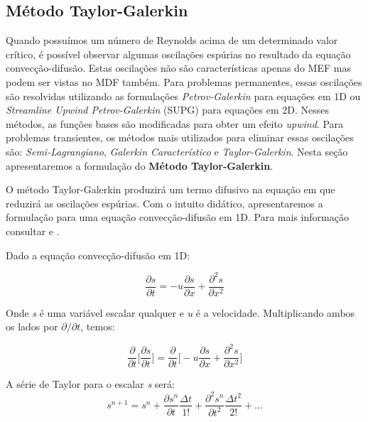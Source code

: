\subsection{Método Taylor-Galerkin}

Quando possuímos um número de Reynolds acima de um determinado
valor crítico, é possível observar algumas oscilações espúrias no resultado
da equação convecção-difusão. Estas oscilações não são características
apenas do MEF mas podem ser vistas no MDF também. Para problemas permanentes,
essas oscilações são resolvidas utilizando as formulações 
\textit{Petrov-Galerkin} para equações em 1D 
ou \textit{Streamline Upwind Petrov-Galerkin} (SUPG) para
equações em 2D. Nesses métodos, as funções bases são modificadas
para obter um efeito \textit{upwind}. Para problemas transientes,
os métodos mais utilizados para eliminar essas oscilações são:
\textit{Semi-Lagrangiano}, \textit{Galerkin Característico} e
\textit{Taylor-Galerkin}. 
Nesta seção apresentaremos a formulação do \textbf{Método Taylor-Galerkin}.


\medskip
O método Taylor-Galerkin produzirá um termo difusivo na equação em que
reduzirá as oscilações espúrias. Com o intuito didático, apresentaremos
a formulação para uma equação convecção-difusão em 1D. Para mais informação
consultar \cite{donea1984} e \cite{zienkiewiczvol3}.

\medskip
Dado a equação convecção-difusão em 1D:

\begin{equation} \label{convection diffusion 1D}
 \frac{\partial s}{\partial t} 
 = 
 - u \frac{\partial s}{\partial x}
 + \frac{\partial^2 s}{\partial x^2} 
\end{equation}

\medskip
Onde \textit{s} é uma variável escalar qualquer e \textit{u}
é a velocidade.
Multiplicando ambos os lados por $\partial / \partial t$, temos:

\begin{equation} \label{convection diffusion 1D mod}
 \frac{\partial }{\partial t}
 \bigg[ 
 \frac{\partial s}{\partial t} 
 \bigg]
 = 
 \frac{\partial }{\partial t}
 \bigg[ 
 - u \frac{\partial s}{\partial x}
 + \frac{\partial^2 s}{\partial x^2} 
 \bigg]
\end{equation}

A série de Taylor para o escalar \textit{s} será:
\begin{equation}
 s^{n+1} = s^{n} 
         + \frac{\partial s^{n}}{\partial t} \frac{\Delta t}{1!} 
         + \frac{\partial^2 s^{n}}{\partial t^2} \frac{\Delta t^2}{2!}
         + ...
\end{equation}

